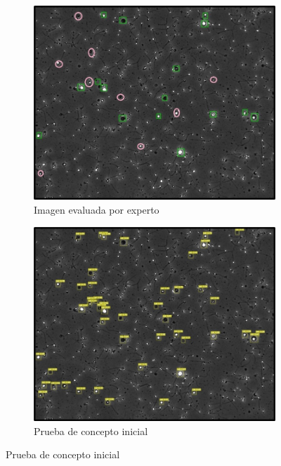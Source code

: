\documentclass[12pt,a4paper,onecolumn,oneside]{report}
\begin{document}
\begin{figure}[H]
  \centering
  \begin{subfigure}[b]{0.48\textwidth}
    \centering
    \includegraphics[width=\textwidth]{figuras/evaluacion_cualitativa/221/221.jpg}
    \caption{Imagen evaluada por experto}
    \label{fig:exp_image_221}
  \end{subfigure}
  \hfill
  \begin{subfigure}[b]{0.48\textwidth}
    \centering
    \includegraphics[width=\textwidth]{figuras/evaluacion_cualitativa/221/221_v7.jpg}
    \caption{Prueba de concepto inicial}
    \label{fig:poc_image_221}
  \end{subfigure}
  

\end{figure}
\end{document}
